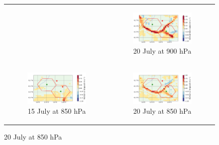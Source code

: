 \begin{figure}[hbtp]
\begin{tabular}{cc}
\begin{subfigure}[t]{0.5\textwidth}
        \end{subfigure} &
        \begin{subfigure}[t]{0.5\textwidth}
            \caption{20 July at 900 hPa}
            \includegraphics[width=\textwidth]{images/chap6/IOP_maps/mesoNH_vertwind_900_2021-07-20T12:00:00.png}
        \end{subfigure} \\
        \begin{subfigure}[t]{0.5\textwidth}
            \caption{15 July at 850 hPa}
            \includegraphics[width=\textwidth]{images/chap6/IOP_maps/mesoNH_vertwind_850_2021-07-15T12:00:00.png}
        \end{subfigure} &
        \begin{subfigure}[t]{0.5\textwidth}
            \caption{20 July at 850 hPa}
            \includegraphics[width=\textwidth]{images/chap6/IOP_maps/mesoNH_vertwind_850_2021-07-20T12:00:00.png}

\end{subfigure}
\end{tabular}
\end{figure}
